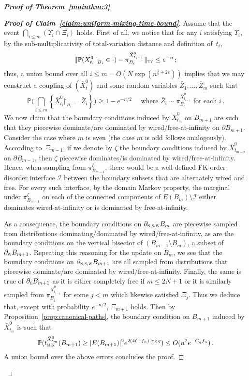 \documentclass[reqno,11pt]{amsart}
\numberwithin{equation}{section}
\renewcommand{\restriction}{\mathord{\upharpoonright}}
\renewcommand{\epsilon}{\varepsilon}
\theoremstyle{definition}{
\newtheorem{example}[theorem]{Example}
\newtheorem{definition}[theorem]{Definition}
\newtheorem*{definition*}{Definition}
\newtheorem{problem}[theorem]{Problem}
\newtheorem{question}[theorem]{Question}
\newtheorem{remark}[theorem]{Remark}
}
\renewcommand{\P}{\mathbb P}
\renewcommand{\epsilon}{\varepsilon}
\newcommand{\tmix}{t_{\textsc{mix}}}
\newcommand{\tv}{{\textsc{tv}}}
\newcommand{\north}{{\textsc{n}}}
\newcommand{\south}{{\textsc{s}}}
\newcommand{\east}{{\textsc{e}}}
\newcommand{\west}{{\textsc{w}}}
\begin{document}
\begin{proof}[\textbf{\emph{Proof of Theorem~\ref{mainthm:3}}}]
\begin{proof}[\textbf{\emph{Proof of Claim~\ref{claim:uniform-mixing-time-bound}}}]
Assume that the event $\bigcap_{i\leq m}(\Upsilon_i\cap \Xi_i)$ holds. First of all, we notice that for any $i$ satisfying $\Upsilon_i$, by the sub-multiplicativity of total-variation distance and definition of~$t_i$, 
\begin{align}\label{eq:coupling-probability}
\|\mathbb P (\bar X_{t_i}^0\restriction_{B_i} \in \cdot) - \pi^{\bar X_{t_{i-1}}^{0}}_{B_i}\|_\tv \leq e^{-n}\,;
\end{align} 
thus, a union bound over all $i\leq m = O(N \exp(n^{\frac 12+2\epsilon}))$ implies that we may construct a coupling of $(\bar X_{t}^0)$ and some random variables $\bar Z_1,\ldots,\bar Z_m$ such that 
\[ \P\bigg( \bigcap_{i\leq m}\left\{\bar X_{t_i}^{0}\restriction_{B_i} = \bar Z_i\right\}\bigg) \geq 1-e^{-n/2}\quad \mbox{ where $\bar Z_i\sim \pi_{B_i}^{\bar X_{t_{i-1}}^0}$ for each $i$}\,.\]
 We now claim that the boundary conditions induced by $\bar X_{t_m}^{0}$ on $B_{m+1}$ are such that they piecewise dominate/are dominated by wired/free-at-infinity on $\partial B_{m+1}$. Consider the case where $m$ is even (the case $m$ is odd follows analogously). According to~$\Xi_{m-1}$, if we denote by $\zeta$ the boundary conditions induced by $\bar X_{t_{m-2}}^0$ on $\partial B_{m-1}$, then $\zeta$ piecewise dominates/is dominated by wired/free-at-infinity. Hence, when sampling from $\pi_{B_{m-1}}^\zeta$, there would be a well-defined FK order-disorder interface $\mathcal I$ between the boundary subsets that are alternately wired and free. For every such interface, by the domain Markov property, the marginal under $\pi_{B_{m-1}}^\zeta$ on each of the connected components of $E(B_m)\setminus \mathcal I$ either dominates wired-at-infinity or is dominated by free-at-infinity. 

As a consequence, the boundary conditions on $\partial_{\north,\south,\west} B_{m}$ are piecewise sampled from distributions dominating/dominated by wired/free-at-infinity, as are the boundary conditions on the vertical bisector of $ (B_{m-1}\setminus B_{m})$, a subset of $\partial_\west B_{m+1}$. Repeating this reasoning for the update on $B_{m}$, we see that the boundary conditions on $\partial_{\north,\south,\west} B_{m+1}$ are all sampled from distributions that piecewise dominate/are dominated by wired/free-at-infinity. Finally, the same is true of $\partial_\east B_{m+1}$ as it is either completely free if $m\leq 2N+1$ or it is similarly sampled from $\pi_{B_{j}}^{\bar X_{t_{j-1}}^0}$ for some $j<m$ which likewise satisfied $\Xi_{j}$. Thus we deduce that, except with probability $e^{-n/2}$, $\Xi_{m+1}$ holds. 
Then by Proposition~\ref{prop:canonical-paths}, the boundary condition on $B_{m+1}$ induced by $\bar X_{t_m}^0$ is such that 
\begin{align*}
\mathbb P (\tmix^{\bar X_{t_{m}}^{0}}(B_{m+1})\geq |E(B_{m+1})|^2 e^{2(4\ell+f_n)\log q}) \leq O(n^2 e^{-C_q f_n})\,.
\end{align*}
A union bound over the above errors concludes the proof.
\end{proof}


\end{proof}
\end{document}
